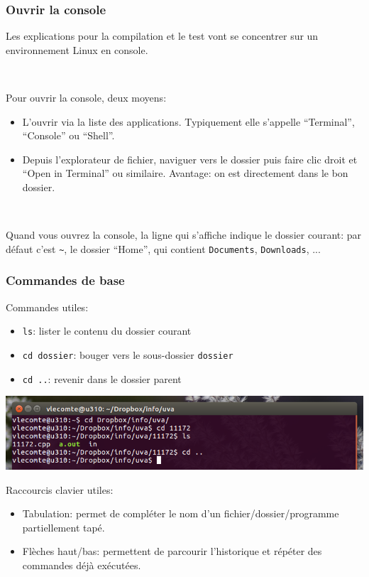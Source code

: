 \documentclass[12pt]{beamer}
\begin{document}
\begin{frame}[fragile]
\frametitle{Ouvrir la console}
Les explications pour la compilation et le test vont se concentrer sur un environnement Linux en console.

~

Pour ouvrir la console, deux moyens:
\begin{itemize}
\item L'ouvrir via la liste des applications. Typiquement elle s'appelle ``Terminal'', ``Console'' ou ``Shell''.
\item Depuis l'explorateur de fichier, naviguer vers le dossier puis faire clic droit et ``Open in Terminal'' ou similaire. Avantage: on est directement dans le bon dossier.
\end{itemize}

~

Quand vous ouvrez la console, la ligne qui s'affiche indique le dossier courant: par défaut c'est \lstinline|~|, le dossier ``Home'', qui contient \lstinline|Documents|, \lstinline|Downloads|, ...
\end{frame}

\begin{frame}[fragile]
\frametitle{Commandes de base}
Commandes utiles:
\begin{itemize}
\item \lstinline|ls|: lister le contenu du dossier courant
\item \lstinline|cd dossier|: bouger vers le sous-dossier \lstinline|dossier|
\item \lstinline|cd ..|: revenir dans le dossier parent
\end{itemize}

\begin{center}
\includegraphics[height=0.17\textwidth]{img/console}
\end{center}

Raccourcis clavier utiles:
\begin{itemize}
\item Tabulation: permet de compléter le nom d'un fichier/dossier/programme partiellement tapé.
\item Flèches haut/bas: permettent de parcourir l'historique et répéter des commandes déjà exécutées.
\end{itemize}
\end{frame}
\end{document}
